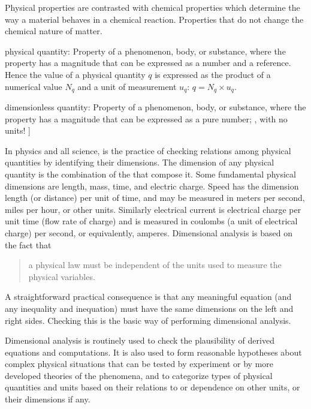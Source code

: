 Physical properties are contrasted with chemical properties which determine the way a material behaves in a chemical reaction. Properties that do not change the chemical nature of matter.

physical quantity: Property of a phenomenon, body, or substance, where the property has a magnitude that can be expressed as a number and a reference. Hence the value of a physical quantity $q$ is expressed as the product of a numerical value $N_q$ and a unit of measurement $u_q$: $q = N_q\times u_q$.

dimensionless quantity: Property of a phenomenon, body, or substance, where the property has a magnitude that can be expressed as a pure number; \ie, with no units!
]

In physics and all science,  is the practice of checking relations among physical quantities by identifying their dimensions. The dimension of any physical quantity is the combination of the  that compose it. Some fundamental physical dimensions are length, mass, time, and electric charge. Speed has the dimension length (or distance) per unit of time, and may be measured in meters per second, miles per hour, or other units. Similarly electrical current is electrical charge per unit time (flow rate of charge) and is measured in coulombs (a unit of electrical charge) per second, or equivalently, amperes. Dimensional analysis is based on the fact that 
\begin{quote}
a physical law must be independent of the units used to measure the physical variables. 
\end{quote}
A straightforward practical consequence is that any meaningful equation (and any inequality and inequation) must have the same dimensions on the left and right sides. Checking this is the basic way of performing dimensional analysis.

Dimensional analysis is routinely used to check the plausibility of derived equations and computations. It is also used to form reasonable hypotheses about complex physical situations that can be tested by experiment or by more developed theories of the phenomena, and to categorize types of physical quantities and units based on their relations to or dependence on other units, or their dimensions if any.


